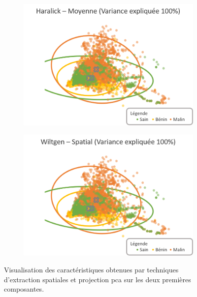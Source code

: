 \begin{figure}[H]
    \begin{subfigure}{.49\textwidth}
      \includegraphics[width=\textwidth]{contents/chapter_4/resources/visualisation_spatial_HaralickMean.png}
    \end{subfigure}
    \begin{subfigure}{.49\textwidth}
      \includegraphics[width=\textwidth]{contents/chapter_4/resources/visualisation_spatial_WiltgenSpatial.png}
    \end{subfigure}
    
    \caption{Visualisation des caractéristiques obtenues par techniques d'extraction spatiales et projection \gls{pca} sur les deux premières composantes.}
    \label{fig:visualisation_spatial}
\end{figure}\par

